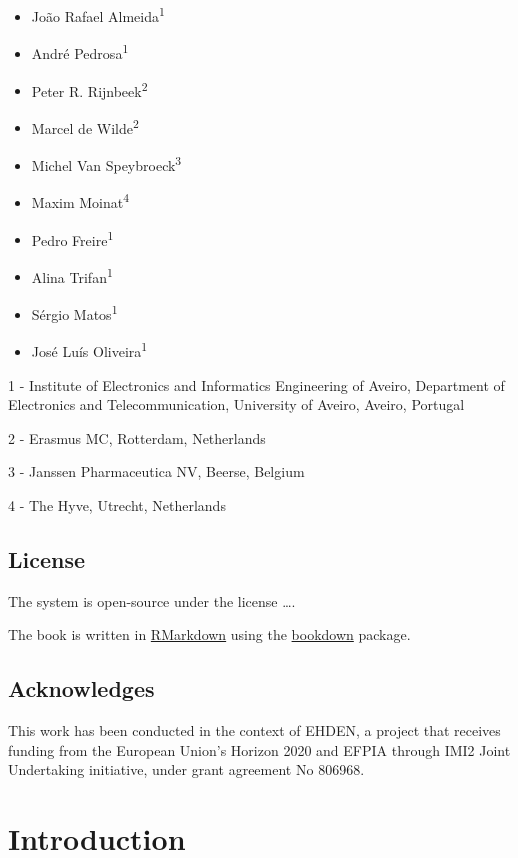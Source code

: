 \documentclass[]{book}
\providecommand{\tightlist}{%
  \setlength{\itemsep}{0pt}\setlength{\parskip}{0pt}}
\begin{document}
\begin{itemize}
\tightlist
\item
  João Rafael Almeida\textsuperscript{1}
\item
  André Pedrosa\textsuperscript{1}
\item
  Peter R. Rijnbeek\textsuperscript{2}
\item
  Marcel de Wilde\textsuperscript{2}
\item
  Michel Van Speybroeck\textsuperscript{3}
\item
  Maxim Moinat\textsuperscript{4}
\item
  Pedro Freire\textsuperscript{1}
\item
  Alina Trifan\textsuperscript{1}
\item
  Sérgio Matos\textsuperscript{1}
\item
  José Luís Oliveira\textsuperscript{1}
\end{itemize}

1 - Institute of Electronics and Informatics Engineering of Aveiro,
Department of Electronics and Telecommunication, University of Aveiro,
Aveiro, Portugal

2 - Erasmus MC, Rotterdam, Netherlands

3 - Janssen Pharmaceutica NV, Beerse, Belgium

4 - The Hyve, Utrecht, Netherlands

\section*{License}\label{license}

The system is open-source under the license \ldots{}.

The book is written in \href{https://rmarkdown.rstudio.com}{RMarkdown}
using the \href{https://bookdown.org}{bookdown} package.

\section*{Acknowledges}\label{acknowledges}

This work has been conducted in the context of EHDEN, a project that
receives funding from the European Union's Horizon 2020 and EFPIA
through IMI2 Joint Undertaking initiative, under grant agreement No
806968.

\chapter{Introduction}\label{introduction}
\end{document}
